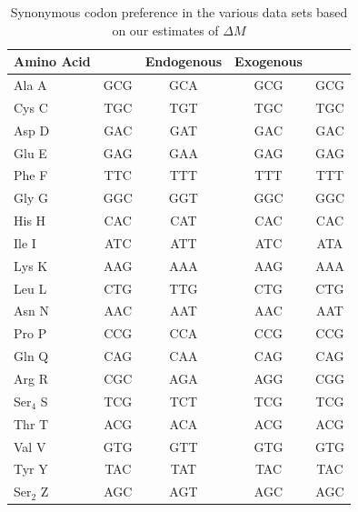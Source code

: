 \documentclass[12pt]{article}
\begin{document}
\begin{table}
    \centering
\begin{tabular}{  l  c  c  c  c  }
\hline
	Amino Acid & \gossypii & Endogenous & Exogenous & \kluyveri \\ \hline \hline
	Ala A & GCG & GCA & GCG & GCG \\ \hline
	Cys C & TGC & TGT & TGC & TGC \\ \hline
	Asp D & GAC & GAT & GAC & GAC \\ \hline
	Glu E & GAG & GAA & GAG & GAG \\ \hline
	Phe F & TTC & TTT & TTT & TTT \\ \hline
	Gly G & GGC & GGT & GGC & GGC \\ \hline
	His H & CAC & CAT & CAC & CAC \\ \hline
	Ile I & ATC & ATT & ATC & ATA \\ \hline
	Lys K & AAG & AAA & AAG & AAA \\ \hline
	Leu L & CTG & TTG & CTG & CTG \\ \hline
	Asn N & AAC & AAT & AAC & AAT \\ \hline
	Pro P & CCG & CCA & CCG & CCG \\ \hline
	Gln Q & CAG & CAA & CAG & CAG \\ \hline
	Arg R & CGC & AGA & AGG & CGG \\ \hline
	Ser$_4$ S & TCG & TCT & TCG & TCG \\ \hline
	Thr T & ACG & ACA & ACG & ACG \\ \hline
	Val V & GTG & GTT & GTG & GTG \\ \hline
	Tyr Y & TAC & TAT & TAC & TAC \\ \hline
	Ser$_2$ Z & AGC & AGT & AGC & AGC \\ \hline
\end{tabular}
    \caption{Synonymous codon preference in the various data sets based on our estimates of $\Delta M$}
    \label{tab:codon_pref_dm}
\end{table}

\clearpage
\end{document}
